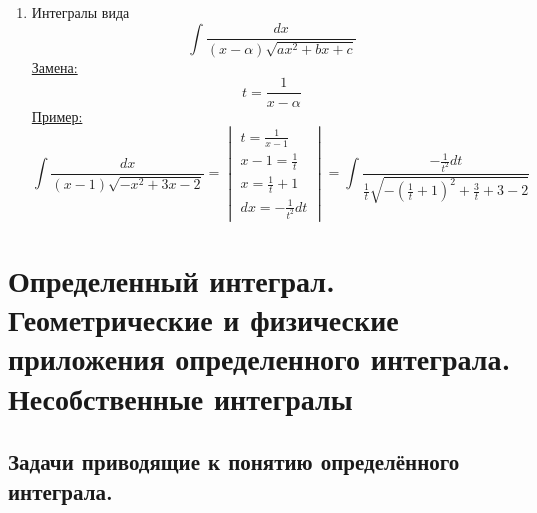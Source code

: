\documentclass[12pt]{article}
\begin{document}
\begin{enumerate}
        \item Интегралы вида
        \[ \int \frac{dx}{(x-\alpha)\sqrt{ax^2 + bx + c}} \]
        \underline{Замена:} 
        \[ \boxed{t = \frac{1}{x-\alpha}} \]
        \underline{Пример:}
        \[ \int \frac{dx}{(x-1)\sqrt{-x^2+3x-2}} = \begin{vmatrix}
            t = \frac{1}{x-1}\\
            x - 1 = \frac{1}{t}\\
            x = \frac{1}{t} + 1\\
            dx = -\frac{1}{t^2}dt
        \end{vmatrix} = \int \frac{-\frac{1}{t^2}dt}{\frac{1}{t}\sqrt{-\left( \frac{1}{t} + 1 \right)^2 + \frac{3}{t} + 3 - 2}} \]
    \end{enumerate}

    \section{Определенный интеграл. Геометрические и физические приложения определенного интеграла. Несобственные интегралы}
    \subsection{Задачи приводящие к понятию определённого интеграла.}
\end{document}
